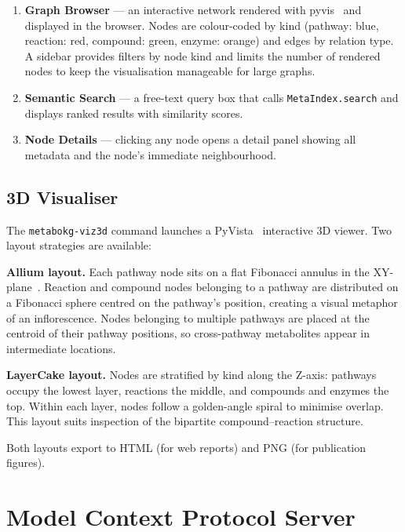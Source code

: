 \documentclass[10pt]{article}
\begin{document}
\begin{enumerate}[leftmargin=*,itemsep=2pt]
  \item \textbf{Graph Browser} --- an interactive network rendered with
    pyvis~\citep{pyvis2021} and displayed in the browser. Nodes are
    colour-coded by kind (pathway: blue, reaction: red, compound: green,
    enzyme: orange) and edges by relation type. A sidebar provides filters
    by node kind and limits the number of rendered nodes to keep the
    visualisation manageable for large graphs.
  \item \textbf{Semantic Search} --- a free-text query box that calls
    \texttt{MetaIndex.search} and displays ranked results with similarity
    scores.
  \item \textbf{Node Details} --- clicking any node opens a detail panel
    showing all metadata and the node's immediate neighbourhood.
\end{enumerate}

\subsection{3D Visualiser}

The \texttt{metabokg-viz3d} command launches a PyVista~\citep{sullivan2019pyvista}
interactive 3D viewer. Two layout strategies are available:

\textbf{Allium layout.} Each pathway node sits on a flat Fibonacci annulus in
the XY-plane~\citep{vogel1979fibonacci}. Reaction and compound nodes belonging
to a pathway are distributed on a Fibonacci sphere centred on the pathway's
position, creating a visual metaphor of an inflorescence. Nodes belonging to
multiple pathways are placed at the centroid of their pathway positions, so
cross-pathway metabolites appear in intermediate locations.

\textbf{LayerCake layout.} Nodes are stratified by kind along the Z-axis:
pathways occupy the lowest layer, reactions the middle, and compounds and
enzymes the top. Within each layer, nodes follow a golden-angle spiral to
minimise overlap. This layout suits inspection of the bipartite
compound--reaction structure.

Both layouts export to HTML (for web reports) and PNG (for publication
figures).

\section{Model Context Protocol Server}
\label{sec:mcp}
\end{document}

